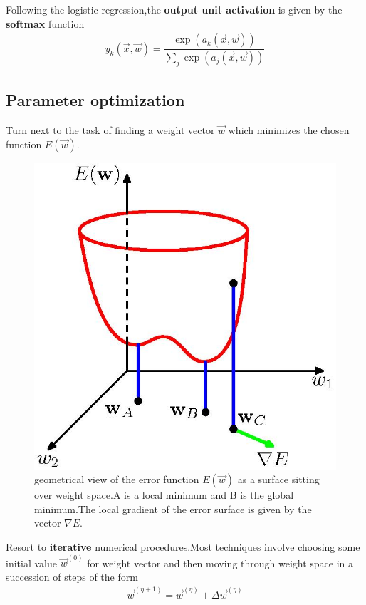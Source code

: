 Following the logistic regression,the \textbf{output unit activation} is given by the \textbf{softmax} function
\begin{align}
    y_k(\vec{x},\vec{w})=\dfrac{\exp(a_k(\vec{x},\vec{w}))}{\sum_j\exp(a_j(\vec{x},\vec{w})) }
\end{align}

\subsection{Parameter optimization}
Turn next to the task of finding a weight vector $\vec{w}$ which minimizes the chosen function $E(\vec{w})$.
\begin{figure}
    \includegraphics{figures/prml/Figure5.5.jpg}
    \caption{geometrical view of the error function $E(\vec{w})$ as a surface sitting over weight space.A is a local minimum and B is the global minimum.The local gradient of the error surface is given by the vector $\nabla E$.}
\end{figure}
Resort to \textbf{iterative} numerical procedures.Most techniques involve choosing some initial value $\vec{w}^{(0)}$ for weight vector and then moving through weight space in a succession of steps of the form
\begin{align}
    \vec{w}^{(\eta+1)}=\vec{w}^{(\eta)}+\Delta \vec{w}^{(\eta)}
\end{align}

